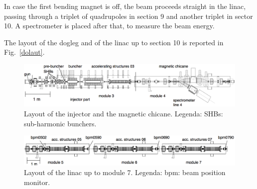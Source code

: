 In case the first bending magnet is off, the beam proceeds straight in the linac, passing through a triplet of quadrupoles in section 9 and another triplet in sector 10. A spectrometer is placed after that, to measure the beam energy. 

The layout of the dogleg and of the linac up to section 10 is reported in Fig.~\ref{dolaut}.


\begin{landscape}
\begin{center}

\begin{figure}
\centering 
\includegraphics[width=23cm,keepaspectratio]{pictures/Injector}
\caption{Layout of the injector and the magnetic chicane. Legenda: SHBs: sub-harmonic bunchers.\vspace{4mm}}
\label{injlayout}
\end{figure}



\begin{figure}
\centering 
\includegraphics[width=23cm,keepaspectratio]{pictures/girder5-7}
\caption{Layout of the linac up to module 7. Legenda: bpm: beam position monitor.}
\label{linaclayout}
\end{figure}

\end{center}
\end{landscape}



